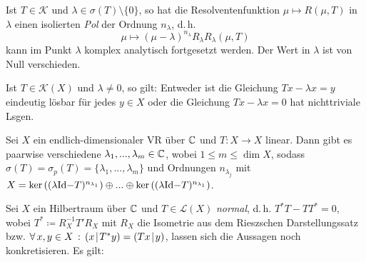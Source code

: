 \documentclass{cheat-sheet}
\newcommand{\scp}[2]{\left( #1 \!\mid\! #2 \right)} %
\begin{document}


\begin{kor}
  Ist $T \in \mathcal{K}$ und $\lambda \in \sigma(T) \setminus \{ 0 \}$, so hat die Resolventenfunktion $\mu \mapsto R(\mu, T)$ in $\lambda$ einen isolierten \emph{Pol} der Ordnung $n_{\lambda}$, d.\,h.
  \[ \mu \mapsto (\mu - \lambda)^{n_\lambda} R_{\lambda} R_{\lambda}(\mu, T) \]
  kann im Punkt $\lambda$ komplex analytisch fortgesetzt werden. Der Wert in $\lambda$ ist von Null verschieden.
\end{kor}


\begin{kor}
  Ist $T \in \mathcal{K}(X)$ und $\lambda \not= 0$, so gilt: Entweder ist die Gleichung $Tx - \lambda x = y$ eindeutig lösbar für jedes $y \in X$ oder die Gleichung $Tx - \lambda x = 0$ hat nichttriviale Lsgen.
\end{kor}

\begin{kor}
  Sei $X$ ein endlich-dimensionaler VR über $\mathbb{C}$ und $T : X {\to} X$ linear. Dann gibt es paarwise verschiedene $\lambda_1, ..., \lambda_m \in \mathbb{C}$, wobei $1 \leq m \leq \dim X$, sodass $\sigma(T) = \sigma_p(T) = \{ \lambda_1, ..., \lambda_m \}$ und Ordnungen $n_{\lambda_j}$ mit $X = \ker \left( (\lambda \mathrm{Id} {-} T)^{n_{\lambda_1}} \right) \oplus ... \oplus \ker \left( (\lambda \mathrm{Id} {-} T)^{n_{\lambda_1}} \right)$.
\end{kor}


Sei $X$ ein Hilbertraum über $\mathbb{C}$ und $T \in \mathcal{L}(X)$ \emph{normal}, d.\,h. $T^* T - T T^* = 0$, wobei $T^* \coloneqq R_{X}^{-1} T' R_X$ mit $R_X$ die Isometrie aus dem Rieszschen Darstellungssatz bzw. $\fa{x, y \in X} \scp{x}{T^* y} = \scp{Tx}{y}$, lassen sich die Aussagen noch konkretisieren. Es gilt:
\end{document}

